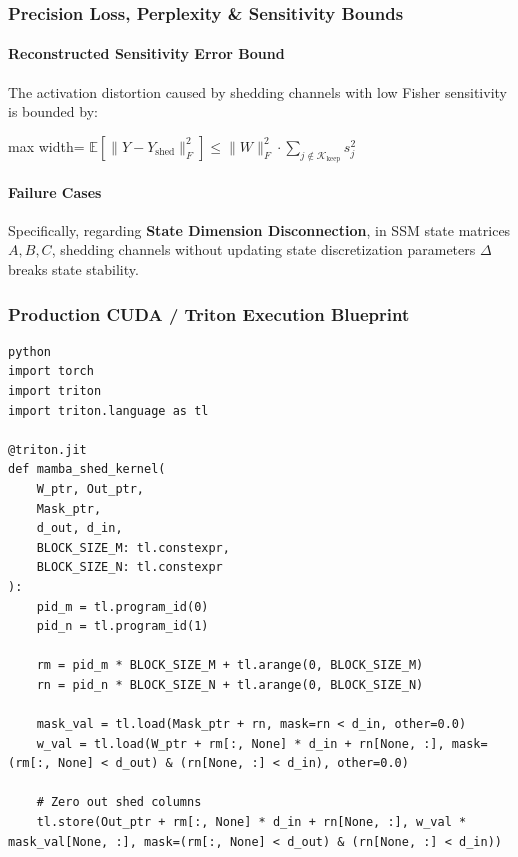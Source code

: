 \subsubsection*{Precision Loss, Perplexity \& Sensitivity Bounds}

\paragraph{Reconstructed Sensitivity Error Bound}

The activation distortion caused by shedding channels with low Fisher sensitivity is bounded by:

\begin{center}
\begin{adjustbox}{max width=\columnwidth}
$\displaystyle
\mathbb{E}\left[ \| Y - Y_{\text{shed}} \|_F^2 \right] \le \| W \|_F^2 \cdot \sum_{j \notin \mathcal{K}_{\text{keep}}} s_j^2
$
\end{adjustbox}
\end{center}

\paragraph{Failure Cases}

Specifically, regarding \textbf{State Dimension Disconnection}, in SSM state matrices $A, B, C$, shedding channels without updating state discretization parameters $\Delta$ breaks state stability.



\subsubsection*{Production CUDA / Triton Execution Blueprint}

\vspace{0.5em}
\begin{mdframed}[backgroundcolor=codebg, linecolor=codeframe, linewidth=1pt, roundcorner=4pt, innerleftmargin=2pt, innerrightmargin=5pt, innertopmargin=5pt, innerbottommargin=5pt]
\begin{lstlisting}
python
import torch
import triton
import triton.language as tl

@triton.jit
def mamba_shed_kernel(
    W_ptr, Out_ptr,
    Mask_ptr,
    d_out, d_in,
    BLOCK_SIZE_M: tl.constexpr,
    BLOCK_SIZE_N: tl.constexpr
):
    pid_m = tl.program_id(0)
    pid_n = tl.program_id(1)

    rm = pid_m * BLOCK_SIZE_M + tl.arange(0, BLOCK_SIZE_M)
    rn = pid_n * BLOCK_SIZE_N + tl.arange(0, BLOCK_SIZE_N)

    mask_val = tl.load(Mask_ptr + rn, mask=rn < d_in, other=0.0)
    w_val = tl.load(W_ptr + rm[:, None] * d_in + rn[None, :], mask=(rm[:, None] < d_out) & (rn[None, :] < d_in), other=0.0)

    # Zero out shed columns
    tl.store(Out_ptr + rm[:, None] * d_in + rn[None, :], w_val * mask_val[None, :], mask=(rm[:, None] < d_out) & (rn[None, :] < d_in))
\end{lstlisting}
\end{mdframed}
\vspace{0.5em}


